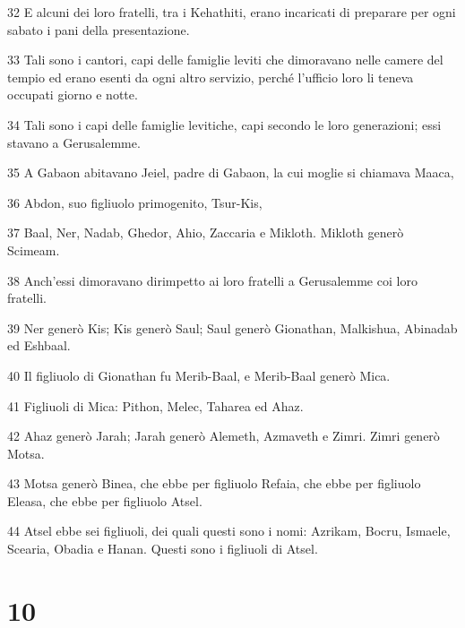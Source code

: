\par 32 E alcuni dei loro fratelli, tra i Kehathiti, erano incaricati di preparare per ogni sabato i pani della presentazione.
\par 33 Tali sono i cantori, capi delle famiglie leviti che dimoravano nelle camere del tempio ed erano esenti da ogni altro servizio, perché l'ufficio loro li teneva occupati giorno e notte.
\par 34 Tali sono i capi delle famiglie levitiche, capi secondo le loro generazioni; essi stavano a Gerusalemme.
\par 35 A Gabaon abitavano Jeiel, padre di Gabaon, la cui moglie si chiamava Maaca,
\par 36 Abdon, suo figliuolo primogenito, Tsur-Kis,
\par 37 Baal, Ner, Nadab, Ghedor, Ahio, Zaccaria e Mikloth. Mikloth generò Scimeam.
\par 38 Anch'essi dimoravano dirimpetto ai loro fratelli a Gerusalemme coi loro fratelli.
\par 39 Ner generò Kis; Kis generò Saul; Saul generò Gionathan, Malkishua, Abinadab ed Eshbaal.
\par 40 Il figliuolo di Gionathan fu Merib-Baal, e Merib-Baal generò Mica.
\par 41 Figliuoli di Mica: Pithon, Melec, Taharea ed Ahaz.
\par 42 Ahaz generò Jarah; Jarah generò Alemeth, Azmaveth e Zimri. Zimri generò Motsa.
\par 43 Motsa generò Binea, che ebbe per figliuolo Refaia, che ebbe per figliuolo Eleasa, che ebbe per figliuolo Atsel.
\par 44 Atsel ebbe sei figliuoli, dei quali questi sono i nomi: Azrikam, Bocru, Ismaele, Scearia, Obadia e Hanan. Questi sono i figliuoli di Atsel.

\chapter{10}

